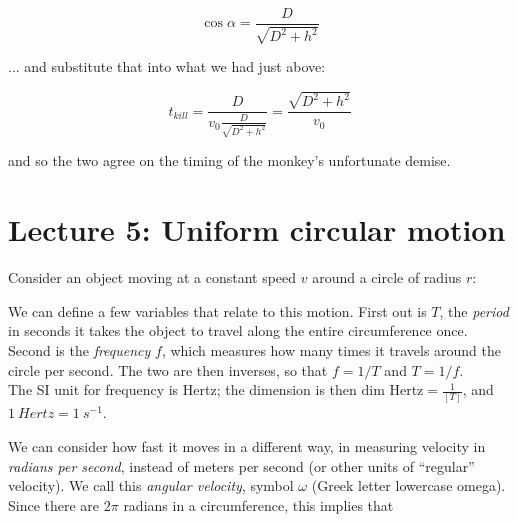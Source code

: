 \begin{equation}
\cos \alpha = \frac{D}{\sqrt{D^2 + h^2}}
\end{equation}

... and substitute that into what we had just above:

\begin{equation}
t_{kill} = \frac{D}{v_0 \frac{D}{\sqrt{D^2 + h^2}}} = \frac{\sqrt{D^2 + h^2}}{v_0} 
\end{equation}

and so the two agree on the timing of the monkey's unfortunate demise.

\newpage

\section{Lecture 5: Uniform circular motion}

Consider an object moving at a constant speed $v$ around a circle of radius $r$:

\begin{figure}[H]
  \centering
{}
\end{figure}

We can define a few variables that relate to this motion. First out is $T$, the \emph{period} in seconds it takes the object to travel along the entire circumference once. Second is the \emph{frequency} $f$, which measures how many times it travels around the circle per second. The two are then inverses, so that $f = 1/T$ and $T = 1/f$.\\
The SI unit for frequency is Hertz; the dimension is then $\text{dim Hertz} = \displaystyle \frac{1}{[T]}$, and $\SI{1}{Hertz} = \SI{1}{s^{-1}}$.

We can consider how fast it moves in a different way, in measuring velocity in \emph{radians per second}, instead of meters per second (or other units of ``regular'' velocity). We call this \emph{angular velocity}, symbol $\omega$ (Greek letter lowercase omega). Since there are $2\pi$ radians in a circumference, this implies that

